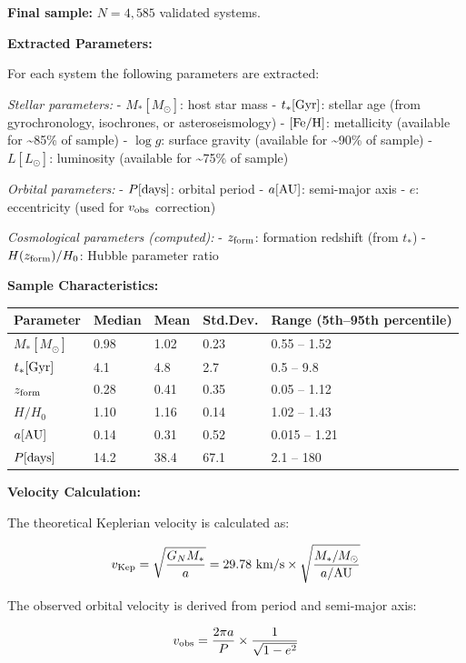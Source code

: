 \documentclass[11pt,a4paper]{article}
\begin{document}
\textbf{Final sample:} \(N = 4,585\) validated systems.

\textbf{Extracted Parameters:}

For each system the following parameters are extracted:

\emph{Stellar parameters:} - \(M_* [M_\odot]\): host star mass -
\(t_* [\rm Gyr]\): stellar age (from gyrochronology, isochrones, or
asteroseismology) - \([{\rm Fe/H}]\): metallicity (available for
\textasciitilde85\% of sample) - \(\log g\): surface gravity (available
for \textasciitilde90\% of sample) - \(L [L_\odot]\): luminosity
(available for \textasciitilde75\% of sample)

\emph{Orbital parameters:} - \(P [\rm days]\): orbital period -
\(a [\rm AU]\): semi-major axis - \(e\): eccentricity (used for
\(v_{\rm obs}\) correction)

\emph{Cosmological parameters (computed):} - \(z_{\rm form}\): formation
redshift (from \(t_*\)) - \(H(z_{\rm form})/H_0\): Hubble parameter
ratio

\textbf{Sample Characteristics:}

\begin{longtable}[]{@{}lllll@{}}
\toprule\noalign{}
Parameter & Median & Mean & Std.Dev. & Range (5th--95th percentile) \\
\midrule\noalign{}
\endhead
\bottomrule\noalign{}
\endlastfoot
\(M_* [M_\odot]\) & 0.98 & 1.02 & 0.23 & 0.55 -- 1.52 \\
\(t_* [\rm Gyr]\) & 4.1 & 4.8 & 2.7 & 0.5 -- 9.8 \\
\(z_{\rm form}\) & 0.28 & 0.41 & 0.35 & 0.05 -- 1.12 \\
\(H/H_0\) & 1.10 & 1.16 & 0.14 & 1.02 -- 1.43 \\
\(a [\rm AU]\) & 0.14 & 0.31 & 0.52 & 0.015 -- 1.21 \\
\(P [\rm days]\) & 14.2 & 38.4 & 67.1 & 2.1 -- 180 \\
\end{longtable}

\textbf{Velocity Calculation:}

The theoretical Keplerian velocity is calculated as:

\[v_{\rm Kep} = \sqrt{\frac{G_N M_*}{a}} = 29.78~{\rm km/s} \times \sqrt{\frac{M_*/M_\odot}{a/{\rm AU}}}\]

The observed orbital velocity is derived from period and semi-major
axis:

\[v_{\rm obs} = \frac{2\pi a}{P} \times \frac{1}{\sqrt{1-e^2}}\]
\end{document}
